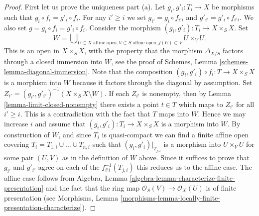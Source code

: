 \begin{proof}
\noindent
First let us prove the uniqueness part (a). Let $g_i, g'_i : T_i \to X$ be
morphisms such that $g_i \circ f_i = g'_i \circ f_i$. For any $i' \geq i$
we set $g_{i'} = g_i \circ f_{i'i}$ and $g'_{i'} = g'_i \circ f_{i'i}$.
We also set $g = g_i \circ f_i = g'_i \circ f_i$.
Consider the morphism
$(g_i, g'_i) : T_i \to X\times_S X$. Set
$$
W =
\bigcup\nolimits_{U \subset X\text{ affine open},
V \subset S\text{ affine open}, f(U) \subset V}
U \times_V U.
$$
This is an open in $X \times_S X$, with the property that the morphism
$\Delta_{X/S}$ factors through a closed immersion into $W$, see the proof
of Schemes, Lemma \ref{schemes-lemma-diagonal-immersion}.
Note that the composition
$(g_i, g'_i) \circ f_i : T \to X \times_S X$ is a morphism into $W$
because it factors through the diagonal by assumption.
Set $Z_{i'} = (g_{i'}, g'_{i'})^{-1}(X \times_S X \setminus W)$.
If each $Z_{i'}$ is nonempty, then by Lemma \ref{lemma-limit-closed-nonempty}
there exists a point $t \in T$ which maps to $Z_{i'}$ for all
$i' \geq i$. This is a contradiction with the fact that $T$ maps into $W$.
Hence we may increase $i$ and assume that $(g_i, g'_i) : T_i \to X \times_S X$
is a morphism into $W$. By construction of $W$, and since $T_i$ is
quasi-compact we can find a finite affine open covering
$T_i = T_{1, i} \cup \ldots \cup T_{n, i}$ such that
$(g_i, g'_i)|_{T_{j, i}}$ is a morphism into $U \times_V U$ for
some pair $(U, V)$ as in the definition of $W$ above.
Since it suffices to prove that $g_{i'}$ and $g'_{i'}$ agree
on each of the $f_{i'i}^{-1}(T_{j, i})$ this reduces us to the affine case.
The affine case follows from
Algebra, Lemma \ref{algebra-lemma-characterize-finite-presentation}
and the fact that the ring map
$\mathcal{O}_S(V) \to \mathcal{O}_X(U)$ is of finite presentation
(see Morphisms,
Lemma \ref{morphisms-lemma-locally-finite-presentation-characterize}).


\end{proof}
